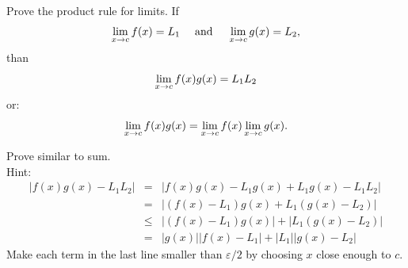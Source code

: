 \begin{Exercise}[difficulty = 2] Prove the product rule for limits. If
    \[\displaystyle\lim_{x\rightarrow c} f(x) = L _1 \quad  \text{ and } \quad  \displaystyle\lim_{x\rightarrow c} g(x) = L_2, \]
    than
    \[\displaystyle\lim_{x\rightarrow c} f(x)g(x) = L_1L_2 \] or:
    \[\displaystyle\lim_{x\rightarrow c} f(x)g(x) = \displaystyle\lim_{x\rightarrow c} f(x) \displaystyle\lim_{x\rightarrow c} g(x). \]

\end{Exercise}

\begin{Answer}\phantom{}
    Prove similar to sum. \\
    Hint: 
    \begin{eqnarray*}
    |f(x)g(x) - L_1 L_2| &=& |f(x)g(x) - L_1 g(x) + L_1 g(x) - L_1 L_2| \\
    &=& |(f(x) - L_1)g(x) + L_1(g(x) - L_2)| \\
    &\leq& |(f(x) - L_1)g(x)| + |L_1(g(x) - L_2)| \\
    &=& |g(x)||f(x) - L_1| + |L_1||g(x) - L_2|
    \end{eqnarray*}
    Make each term in the last line smaller than $\varepsilon/2$ by choosing $x$ close enough to $c$. 
\end{Answer}
    
\fi


